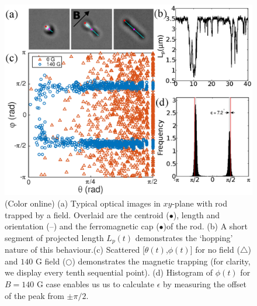 \documentclass[aps,prl,twocolumn,superscriptaddress]{revtex4-1}
\begin{document}
\begin{figure}[t]
\centering
\includegraphics[width=\columnwidth]{figs/Fig2updated.eps}
\caption{\footnotesize \label{fig2} (Color online) (a) Typical optical images in $xy$-plane with rod trapped by a field. Overlaid are the centroid ({\color{magenta}$\bullet$}), length and orientation ({\color{cyan}--}) and the ferromagnetic cap ({\color{red}$\bullet$})of the rod. (b) A short segment of projected length $L_p(t)$ demonstrates the `hopping' nature of this behaviour.(c) Scattered [$\theta(t)$,$\phi(t)$] for no field ({\color{red}$\bigtriangleup$}) and $140$ G field ({\color{NavyBlue}$\bigcirc$}) demonstrates the magnetic trapping (for clarity, we display every tenth sequential point). (d) Histogram of $\phi(t)$ for $B=140$ G case enables us us to calculate $\epsilon$ by measuring the offset of the peak from $\pm \pi/2$.}
\end{figure}
\end{document}
